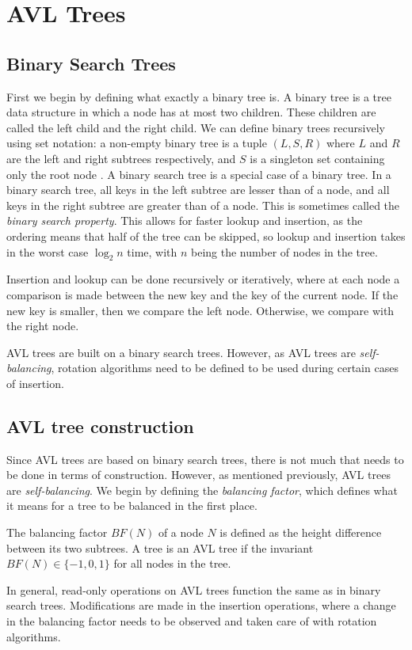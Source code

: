 \section{AVL Trees}

\subsection{Binary Search Trees}
First we begin by defining what exactly a binary tree is. A binary tree is a tree data structure in which a node has at most two children. These children are called
the left child and the right child. We can define binary trees recursively using set notation: a non-empty binary tree is a tuple $(L, S, R)$ where $L$ and $R$ are the left and right
subtrees respectively, and $S$ is a singleton set containing only the root node \cite{tree:set_not}. A binary search tree is a special case of a binary tree. In a binary search tree, all keys 
in the left subtree are lesser than of a node, and all keys in the right subtree are greater than of a node. This is sometimes called the \textit{binary search property}. This allows for faster lookup and insertion, as the ordering means that
half of the tree can be skipped, so lookup and insertion takes in the worst case $\log_2 n$ time, with $n$ being the number of nodes in the tree.

Insertion and lookup can be done recursively or iteratively, where at each node a comparison is made between the new key and the key of the current node. If the new key is smaller, then we compare the left node. Otherwise, we compare with the right node.

AVL trees are built on a binary search trees. However, as AVL trees are \textit{self-balancing}, rotation algorithms need to be defined to be used during certain cases of insertion.

\subsection{AVL tree construction}
Since AVL trees are based on binary search trees, there is not much that needs to be done in terms of construction. However, as mentioned previously, AVL trees are \textit{self-balancing}. 
We begin by defining the \textit{balancing factor}, which defines what it means for a tree to be balanced in the first place.

\begin{definition} 
  The balancing factor $BF(N)$ of a node $N$ is defined as the height difference between its two subtrees. A tree is an AVL tree if the invariant
  $BF(N) \in \{-1, 0, 1\} $ for all nodes in the tree.
\end{definition}

In general, read-only operations on AVL trees function the same as in binary search trees. Modifications are made in the insertion operations, where 
a change in the balancing factor needs to be observed and taken care of with rotation algorithms.
